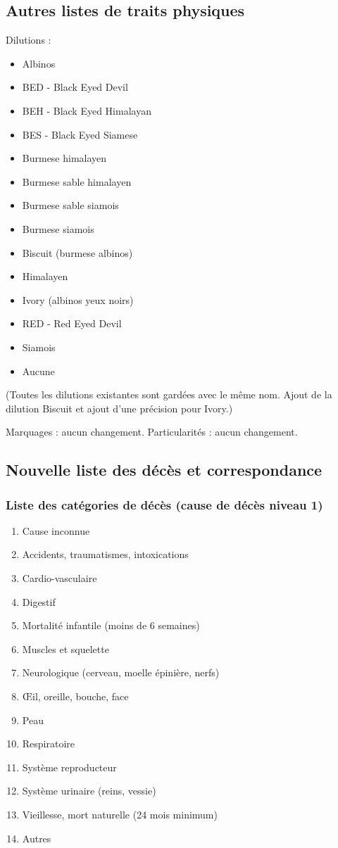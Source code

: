 \documentclass[a4paper,10pt]{article}
\begin{document}
\subsection{Autres listes de traits physiques}

Dilutions : 
\begin{itemize}
\item Albinos
\item BED - Black Eyed Devil
\item BEH - Black Eyed Himalayan
\item BES - Black Eyed Siamese
\item Burmese himalayen
\item Burmese sable himalayen
\item Burmese sable siamois
\item Burmese siamois
\item Biscuit (burmese albinos)
\item Himalayen
\item Ivory (albinos yeux noirs)
\item RED - Red Eyed Devil
\item Siamois
\item Aucune
\end{itemize}
(Toutes les dilutions existantes sont gardées avec le même nom. Ajout de la dilution Biscuit et ajout d'une précision pour Ivory.)

Marquages : aucun changement. Particularités : aucun changement.

\subsection{Nouvelle liste des décès et correspondance}
\subsubsection{Liste des catégories de décès (cause de décès niveau 1)}

\begin{enumerate}
\item Cause inconnue
\item Accidents, traumatismes, intoxications
\item Cardio-vasculaire
\item Digestif
\item Mortalité infantile (moins de 6 semaines)
\item Muscles et squelette
\item Neurologique (cerveau, moelle épinière, nerfs)
\item Œil, oreille, bouche, face
\item Peau
\item Respiratoire
\item Système reproducteur
\item Système urinaire (reins, vessie)
\item Vieillesse, mort naturelle (24 mois minimum)
\item Autres
\end{enumerate}
\end{document}
